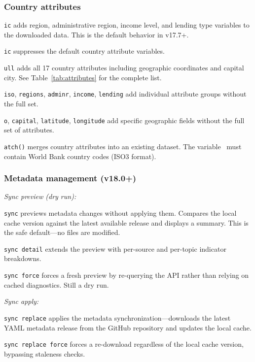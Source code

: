 \documentclass[bib]{statapress}
\begin{document}
\subsubsection*{Country attributes}

\hangpara
\texttt{ic} adds region, administrative region, income level, and lending type variables to the downloaded data. This is the default behavior in v17.7+.

\hangpara
\texttt{ic} suppresses the default country attribute variables.

\hangpara
\texttt{ull} adds all 17 country attributes including geographic coordinates and capital city. See Table~\ref{tab:attributes} for the complete list.

\hangpara
\texttt{iso}, \texttt{regions}, \texttt{adminr}, \texttt{income},
\texttt{lending} add individual attribute groups without the full set.

\hangpara
\texttt{o}, \texttt{capital}, \texttt{latitude}, \texttt{longitude} add specific geographic fields without the full set of attributes.

\hangpara
\texttt{atch(\varname)} merges country attributes into an existing dataset. The variable \varname\ must contain World Bank country codes (ISO3 format).

\subsubsection*{Metadata management (v18.0+)}

\noindent\textit{Sync preview (dry run):}

\hangpara
\texttt{sync} previews metadata changes without applying them. Compares the
local cache version against the latest available release and displays a
summary. This is the safe default---no files are modified.

\hangpara
\texttt{sync detail} extends the preview with per-source and per-topic
indicator breakdowns.

\hangpara
\texttt{sync force} forces a fresh preview by re-querying the API rather
than relying on cached diagnostics. Still a dry run.

\noindent\textit{Sync apply:}

\hangpara
\texttt{sync replace} applies the metadata synchronization---downloads the
latest YAML metadata release from the GitHub repository and updates the
local cache.

\hangpara
\texttt{sync replace force} forces a re-download regardless of the local
cache version, bypassing staleness checks.
\end{document}

